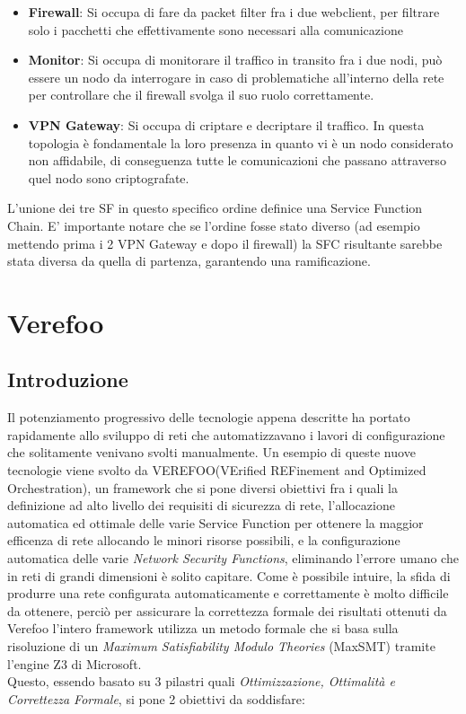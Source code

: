 \begin{itemize}
    \item \textbf{Firewall}: Si occupa di fare da packet filter fra i due webclient, per filtrare solo i pacchetti che effettivamente sono necessari alla comunicazione
    \item \textbf{Monitor}: Si occupa di monitorare il traffico in transito fra i due nodi, può essere un nodo da interrogare in caso di problematiche all'interno della rete per controllare che il firewall svolga il suo ruolo correttamente.
    \item \textbf{VPN Gateway}: Si occupa di criptare e decriptare il traffico. In questa topologia è fondamentale la loro presenza in quanto vi è un nodo considerato non affidabile, di conseguenza tutte le comunicazioni che passano attraverso quel nodo sono criptografate.
\end{itemize}

L'unione dei tre SF in questo specifico ordine definice una Service Function Chain. E' importante notare che se l'ordine fosse stato diverso (ad esempio mettendo prima i 2 VPN Gateway e dopo il firewall)
la SFC risultante sarebbe stata diversa da quella di partenza, garantendo una ramificazione.

\section{Verefoo}
\subsection{Introduzione}
 Il potenziamento progressivo delle tecnologie appena descritte ha portato rapidamente allo sviluppo di reti  che automatizzavano i lavori di configurazione che solitamente venivano svolti manualmente.
 Un esempio di queste nuove tecnologie viene svolto da VEREFOO\cite{Bringhenti2019}(VErified REFinement and Optimized Orchestration), un framework che si pone diversi obiettivi fra i quali la definizione
ad alto livello dei requisiti di sicurezza di rete, l'allocazione automatica ed ottimale delle varie Service Function per ottenere la maggior efficenza di rete allocando le minori risorse possibili, e la
configurazione automatica delle varie \textit{Network Security Functions}, eliminando l'errore  umano che in reti di grandi dimensioni è solito capitare.
Come è possibile intuire, la sfida di produrre una rete configurata automaticamente e correttamente è molto difficile da ottenere, perciò per assicurare la correttezza formale dei risultati ottenuti da Verefoo
l'intero framework utilizza un metodo formale che si basa sulla risoluzione di un \textit{Maximum Satisfiability Modulo Theories} (MaxSMT) tramite l'engine Z3 di Microsoft.\\
Questo, essendo basato su 3 pilastri quali \textit{Ottimizzazione, Ottimalità e Correttezza Formale}, si pone 2 obiettivi da soddisfare:

